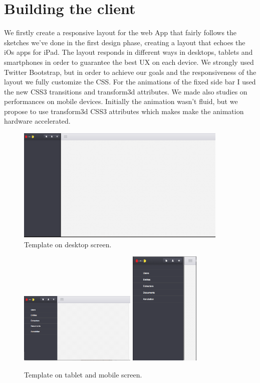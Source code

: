 \documentclass[a4paper,13pt]{report}
\begin{document}
\section{Building the client}
We firstly create a responsive layout for the web App that fairly follows the sketches we've done in the first design phase, creating a layout that echoes the iOs  apps for iPad.
The layout responds in different ways in desktops, tablets and smartphones in order to guarantee the best UX on each device.
We strongly used Twitter Bootstrap, but in order to achieve our goals and the responsiveness of the layout we fully customize the CSS.
For the animations of the fixed side bar I used the new CSS3 transitions and transform3d attributes.
We made also studies on performances on mobile devices. Initially the animation wasn't fluid, but we propose to use transform3d CSS3 attributes which makes make the animation hardware accelerated.
\begin{figure}[H]
  \caption{Template on desktop screen.}
  \centering
    \includegraphics[width=0.9\textwidth]{pics/proto/desktopEmpty}
\end{figure}\begin{figure}[H]
  \caption{Template on tablet  and mobile screen.}
  \centering
    \includegraphics[width=0.5\textwidth]{pics/proto/tabletEmpty}
    \includegraphics[width=0.3\textwidth]{pics/proto/mobileEmpty}
\end{figure}
\end{document}
